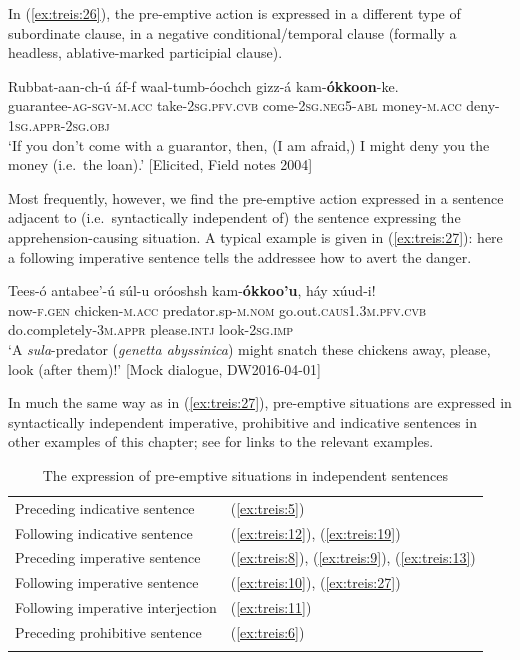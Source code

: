 \documentclass[output=paper,colorlinks,citecolor=brown,
]{langsci/langscibook}
\begin{document}
In (\ref{ex:treis:26}), the pre-emptive action is expressed in a different type of subordinate clause, in a negative conditional\slash temporal clause (formally a headless, ablative-marked participial clause).

\ea\label{ex:treis:26} 
\gll Rubbat-aan-ch-ú 				áf-f 				waal-tumb-óochch gizz-á 			kam-\textbf{ókkoon}-ke. \\
guarantee-\textsc{ag-sgv-m.acc}	take-\textsc{2sg.pfv.cvb} come-\textsc{2sg.neg5-abl} money-\textsc{m.acc}	deny-\textsc{1sg.appr-2sg.obj}\\
\glt `If you don't come with a guarantor, then, (I am afraid,) I might deny you the money (i.e.\ the loan).'   [Elicited, Field notes 2004]
\z 

Most frequently, however, we find the pre-emptive action expressed in a sentence adjacent to (i.e.\ syntactically independent of) the sentence expressing the apprehension-causing situation. A typical example is given in (\ref{ex:treis:27}): here a following imperative sentence tells the addressee how to avert the danger.

\ea\label{ex:treis:27} 
\gll Tees-ó		antabee'-ú			súl-u						oróoshsh kam-\textbf{ókkoo'u}, 					háy			xúud-i! \\
now-\textsc{f.gen}	chicken-\textsc{m.acc}	predator.sp-\textsc{m.nom}	go.out.\textsc{caus1.3m.pfv.cvb} do.completely-\textsc{3m.appr}	please.\textsc{intj}	look-\textsc{2sg.imp}\\
\glt `A \textit{sula}-predator (\textit{genetta abyssinica}) might snatch these chickens away, please, look (after them)!' [Mock dialogue, DW2016-04-01]
\z 

In much the same way as in (\ref{ex:treis:27}), pre-emptive situations are expressed in syntactically independent imperative, prohibitive and indicative sentences in other examples of this chapter; see  for links to the relevant examples.

\begin{table}

    \begin{tabular}{ll}
    \lsptoprule
Preceding indicative sentence &	(\ref{ex:treis:5})\\
Following indicative sentence &	(\ref{ex:treis:12}), (\ref{ex:treis:19})\\
Preceding imperative sentence &	(\ref{ex:treis:8}), (\ref{ex:treis:9}), (\ref{ex:treis:13})\\
Following imperative sentence &	(\ref{ex:treis:10}), (\ref{ex:treis:27})\\
Following imperative interjection &	(\ref{ex:treis:11})\\
Preceding prohibitive sentence & (\ref{ex:treis:6})\\
\lspbottomrule
    \end{tabular}
    \caption{The expression of pre-emptive situations in independent sentences}
    \label{tab:treis:3}
\end{table}
\end{document}
